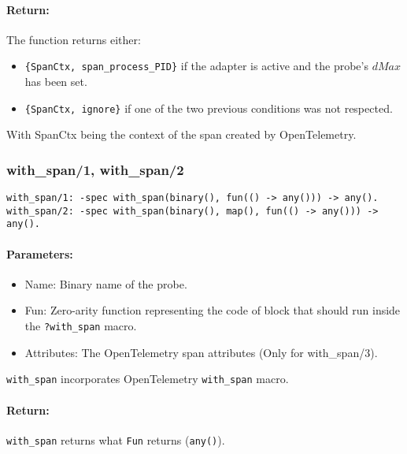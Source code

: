         \paragraph{Return:} 
        The function returns either:
        \begin{itemize}
            \item  \texttt{\{SpanCtx, span\_process\_PID\}} if the adapter is active and the probe's $dMax$ has been set.
            \item \texttt{\{SpanCtx, ignore\}} if one of the two previous conditions was not respected.
        \end{itemize}
        With SpanCtx being the context of the span created by OpenTelemetry.
        
        \subsubsection{with\_span/1, with\_span/2}
        
        \begin{verbatim}
with_span/1: -spec with_span(binary(), fun(() -> any())) -> any().
with_span/2: -spec with_span(binary(), map(), fun(() -> any())) -> any().
        \end{verbatim}
         
        \paragraph{Parameters:}
            \begin{itemize}
                \item Name: Binary name of the probe.
                \item Fun: Zero-arity function representing the code of block that should run inside the \texttt{?with\_span} macro.
                \item Attributes: The OpenTelemetry span attributes (Only for with\_span/3).

            \end{itemize}

        \texttt{with\_span} incorporates OpenTelemetry \texttt{with\_span} macro. \\
        \paragraph{Return:}
            \texttt{with\_span} returns what \texttt{Fun} returns (\texttt{any()}).
        
